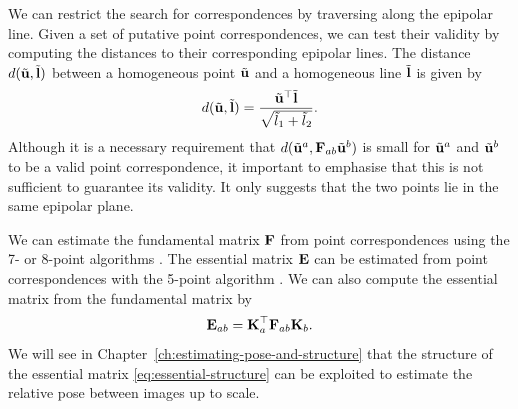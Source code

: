 We can restrict the search for correspondences by traversing along the epipolar line.
Given a set of putative point correspondences, we can test their validity by computing the distances to their corresponding epipolar lines.
The distance $d(\tilde{{\boldsymbol{\mathbf{u}}}}, \tilde{{\boldsymbol{\mathbf{l}}}})$ between a homogeneous point $\tilde{{\boldsymbol{\mathbf{u}}}}$ and a homogeneous line $\tilde{{\boldsymbol{\mathbf{l}}}}$ is given by
\begin{equation}
  d(\tilde{{\boldsymbol{\mathbf{u}}}}, \tilde{{\boldsymbol{\mathbf{l}}}}) = \frac{\tilde{{\boldsymbol{\mathbf{u}}}}^{\top} \tilde{{\boldsymbol{\mathbf{l}}}}}{\sqrt{\tilde{l}_1 + \tilde{l}_2}}.
\end{equation}
Although it is a necessary requirement that $d(\tilde{{\boldsymbol{\mathbf{u}}}}^a, {\boldsymbol{\mathbf{F}}}_{ab} \tilde{{\boldsymbol{\mathbf{u}}}}^b)$ is small for $\tilde{{\boldsymbol{\mathbf{u}}}}^a$ and $\tilde{{\boldsymbol{\mathbf{u}}}}^b$ to be a valid point correspondence, it important to emphasise that this is not sufficient to guarantee its validity.
It only suggests that the two points lie in the same epipolar plane.

We can estimate the fundamental matrix ${\boldsymbol{\mathbf{F}}}$ from point correspondences using the 7- or 8-point algorithms \cite{Hartley2004MultipleVision}.
The essential matrix ${\boldsymbol{\mathbf{E}}}$ can be estimated from point correspondences with the 5-point algorithm \cite{Nister2004AnProblem}.
We can also compute the essential matrix from the fundamental matrix by
\begin{align}
  {\boldsymbol{\mathbf{E}}}_{ab} = {\boldsymbol{\mathbf{K}}}_a^{\top} {\boldsymbol{\mathbf{F}}}_{ab} {\boldsymbol{\mathbf{K}}}_b.
\end{align}
We will see in Chapter~\ref{ch:estimating-pose-and-structure} that the structure of the essential matrix \eqref{eq:essential-structure} can be exploited to estimate the relative pose between images up to scale.

